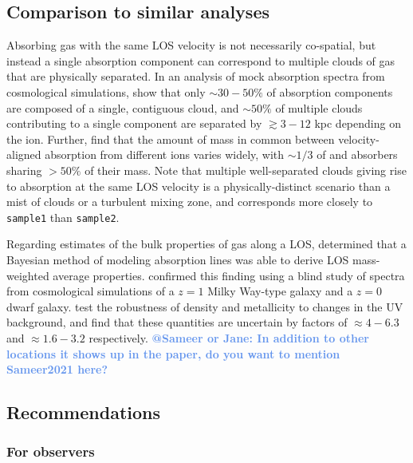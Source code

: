 \documentclass[fleqn,usenatbib]{mnras}
\makeatletter
\newcommand{\atsameer}[1]{\textcolor{CornflowerBlue}{\textbf{@Sameer or Jane: #1}}}
\makeatother
\begin{document}
\subsection{Comparison to similar analyses}

Absorbing gas with the same LOS velocity is not necessarily co-spatial, but instead a single absorption component can correspond to multiple clouds of gas that are physically separated.
In an analysis of mock absorption spectra from cosmological simulations, \cite{Marra2022} show that only $\sim 30-50\%$ of absorption components are composed of a single, contiguous cloud, and $\sim 50\%$ of multiple clouds contributing to a single component are separated by $\gtrsim 3-12$ kpc depending on the ion.
Further, \cite{Marra2022} find that the amount of mass in common between velocity-aligned absorption from different ions varies widely, with $\sim 1/3$ of  and  absorbers sharing $>50\%$ of their mass.
Note that multiple well-separated clouds giving rise to absorption at the same LOS velocity is a physically-distinct scenario than a mist of clouds or a turbulent mixing zone, and corresponds more closely to \texttt{sample1} than \texttt{sample2}.

Regarding estimates of the bulk properties of gas along a LOS,
\cite{Liang2018} determined that a Bayesian method of modeling absorption lines was able to derive LOS  mass-weighted average properties.
\cite{marra2021.cosmo.sims.test.observational.modeling} confirmed this finding using a blind study of spectra from cosmological simulations of a $z=1$ Milky Way-type galaxy and a $z=0$ dwarf galaxy.
\cite{Acharya2021} test the robustness of density and metallicity to changes in the UV background, and find that these quantities are uncertain by factors of $\approx 4-6.3$ and $\approx 1.6-3.2$ respectively.
\atsameer{In addition to other locations it shows up in the paper, do you want to mention Sameer2021 here?} 

\subsection{Recommendations}

\subsubsection{For observers}
\end{document}
